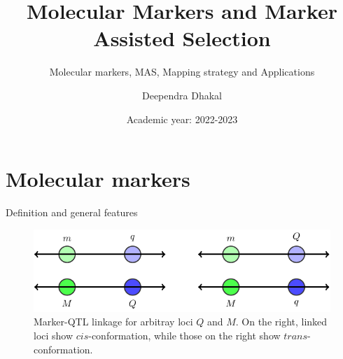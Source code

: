 \documentclass[
  ignorenonframetext,
  aspectratio=169]{beamer}
\title{Molecular Markers and Marker Assisted Selection}
\subtitle{Molecular markers, MAS, Mapping strategy and Applications}
\author{Deependra Dhakal}
\date{Academic year: 2022-2023}
\institute{College of Natural Resource Management, Tikapur \and AFU}
\begin{document}
\frame{\titlepage}

\begin{frame}[allowframebreaks]
  \tableofcontents[hideallsubsections]
\end{frame}
\hypertarget{molecular-markers}{%
\section{Molecular markers}\label{molecular-markers}}

\begin{frame}{Definition and general features}
\protect\hypertarget{definition-and-general-features}{}
\begin{figure}

{\centering \includegraphics[width=0.9\linewidth]{../scripts/marker-qtl-association-diagram} 

}

\caption{Marker-QTL linkage for arbitray loci $Q$ and $M$. On the right, linked loci show $cis$-conformation, while those on the right show $trans$-conformation.}\label{fig:marker-trait-linkage}
\end{figure}
\end{frame}
\end{document}
